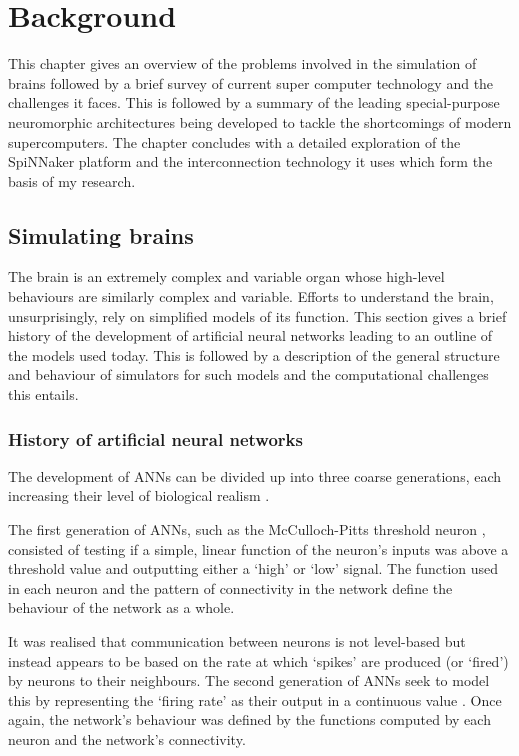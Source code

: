 \chapter{Background}
	
	This chapter gives an overview of the problems involved in the simulation of
	brains followed by a brief survey of current super computer technology and the
	challenges it faces. This is followed by a summary of the leading
	special-purpose neuromorphic architectures being developed to tackle the
	shortcomings of modern supercomputers. The chapter concludes with a detailed
	exploration of the SpiNNaker platform and the interconnection technology it
	uses which form the basis of my research.
	
	\section{Simulating brains}
		\label{sec:simulating-brains}
		
		
		The brain is an extremely complex and variable organ whose high-level
		behaviours are similarly complex and variable. Efforts to understand the
		brain, unsurprisingly, rely on simplified models of its function. This
		section gives a brief history of the development of artificial neural
		networks leading to an outline of the models used today. This is followed by
		a description of the general structure and behaviour of simulators for such
		models and the computational challenges this entails.
		
		\subsection{History of artificial neural networks}
			
			The development of ANNs can be divided up into three coarse generations,
			each increasing their level of biological realism \cite{vainbrand11}.
			
			The first generation of ANNs, such as the McCulloch-Pitts threshold neuron
			\cite{mcculloch43}, consisted of testing if a simple, linear function of
			the neuron's inputs was above a threshold value and outputting either a
			`high' or `low' signal. The function used in each neuron and the pattern
			of connectivity in the network define the behaviour of the network as a
			whole.
			
			It was realised that communication between neurons is not level-based but
			instead appears to be based on the rate at which `spikes' are produced (or
			`fired') by neurons to their neighbours. The second generation of ANNs
			seek to model this by representing the `firing rate' as their output in a
			continuous value \cite{maass97}. Once again, the network's behaviour was
			defined by the functions computed by each neuron and the network's
			connectivity.
			
